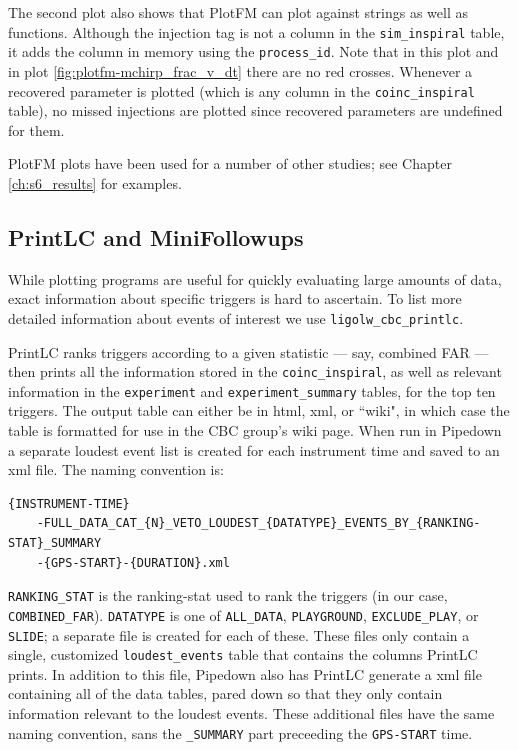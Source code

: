 The second plot also shows that PlotFM can plot against strings as well as functions. Although the injection tag is not a column in the \verb|sim_inspiral| table, it adds the column in memory using the \verb|process_id|. Note that in this plot and in plot \ref{fig:plotfm-mchirp_frac_v_dt} there are no red crosses. Whenever a recovered parameter is plotted (which is any column in the \verb|coinc_inspiral| table), no missed injections are plotted since recovered parameters are undefined for them.

PlotFM plots have been used for a number of other studies; see Chapter \ref{ch:s6_results} for examples.

\subsection{PrintLC and MiniFollowups}

While plotting programs are useful for quickly evaluating large amounts of data, exact information about specific triggers is hard to ascertain. To list more detailed information about events of interest we use \verb|ligolw_cbc_printlc|.

PrintLC ranks triggers according to a given statistic --- say, combined \ac{FAR} --- then prints all the information stored in the \verb|coinc_inspiral|, as well as relevant information in the \verb|experiment| and \verb|experiment_summary| tables, for the top ten triggers. The output table can either be in html, xml, or ``wiki", in which case the table is formatted for use in the \ac{CBC} group's wiki page. When run in Pipedown a separate loudest event list is created for each instrument time and saved to an xml file. The naming convention is:
\begin{footnotesize}
\begin{verbatim}
{INSTRUMENT-TIME}
    -FULL_DATA_CAT_{N}_VETO_LOUDEST_{DATATYPE}_EVENTS_BY_{RANKING-STAT}_SUMMARY
    -{GPS-START}-{DURATION}.xml
\end{verbatim}
\end{footnotesize}
\verb|RANKING_STAT| is the ranking-stat used to rank the triggers (in our case, \verb|COMBINED_FAR|). \verb|DATATYPE| is one of \verb|ALL_DATA|, \verb|PLAYGROUND|, \verb|EXCLUDE_PLAY|, or \verb|SLIDE|; a separate file is created for each of these. These files only contain a single, customized \verb|loudest_events| table that contains the columns PrintLC prints. In addition to this file, Pipedown also has PrintLC generate a xml file containing all of the data tables, pared down so that they only contain information relevant to the loudest events. These additional files have the same naming convention, sans the \verb|_SUMMARY| part preceeding the \verb|GPS-START| time.

